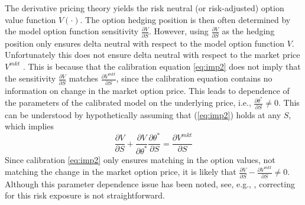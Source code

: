 \documentclass[letterpaper,12pt,titlepage,oneside,final]{book}
\numberwithin{equation}{section}
\theoremstyle{definition}
\newcommand{\Vmkt}{V^{mkt}}
\begin{document}
The derivative pricing theory yields the  risk neutral (or risk-adjusted) option value function $V(\cdot)$.
The option hedging position is then often determined by the model option function sensitivity $\frac{\partial V}{\partial S}$. However, using $\frac{\partial V}{\partial S}$ as the hedging position only ensures delta neutral with respect to the model option function $V$. Unfortunately this does not ensure delta neutral with respect to the market price $V^{mkt}$ .
%
This is because that the calibration equation \eqref{eq:imp2} does not imply that  the sensitivity $\frac{\partial V}{\partial S}$ matches $\frac{\partial \Vmkt}{\partial S}$, since the calibration equation contains no information on change in the market option price.
This leads to dependence of the parameters of the calibrated model on the underlying price, i.e., $\frac{\partial \theta^*}{\partial S} \neq 0$.
This can be understood by
hypothetically assuming that (\ref{eq:imp2}) holds at any $S$, which implies
\begin{equation} 
\frac{\partial V}{\partial S} + \frac{\partial V}{\partial \theta^*}\frac{\partial \theta^*}{\partial S}=\frac{\partial \Vmkt}{\partial S}
\label{eq:MarketDep}
\end{equation}
 Since calibration  \eqref{eq:imp2} only ensures matching in the option values, not matching the change in the market option price, it is likely that $\frac{\partial V}{\partial S}-\frac{\partial \Vmkt}{\partial S} \neq 0$.  
 Although this parameter dependence issue has been noted,  see, e.g., \citep{coleman2001,hulloptimal}, correcting for this risk exposure is not straightforward.
\end{document}
